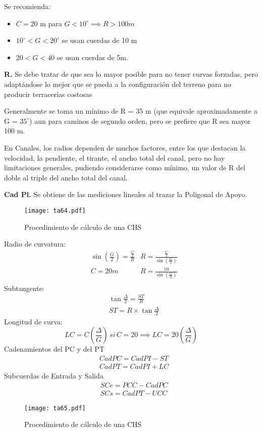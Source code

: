 Se recomienda:
\begin{itemize}
    \item $C=20$ m para $G < 10^{\circ} \implies R > 100 m$
    \item $10^{\circ} <G<20^{\circ}$ se usan cuerdas de 10 m
    \item $20<G<40$ se usan cuerdas de 5m.
\end{itemize}

\textbf{R.} Se debe tratar de que sea lo mayor posible para no tener curvas forzadas, pero adaptándose lo mejor que se pueda a la configuración del terreno para no producir terracerías costosas

Generalmente se toma un mínimo de R = 35 m (que equivale aproximadamente a G = $35^{\circ}$) aun para caminos de segundo orden, pero se prefiere que R sea mayor 100 m.

En Canales, los radios dependen de muchos factores, entre los que destacan la velocidad, la pendiente, el tirante, el ancho total del canal, pero no hay limitaciones generales, pudiendo considerarse como mínimo, un valor de R del doble al triple del ancho total del canal.

\textbf{Cad Pl.} Se obtiene de las mediciones lineales al trazar la Poligonal de Apoyo.

\begin{figure}[h!]
\centering
  \texttt{[image: ta64.pdf]}
  \caption{Procedimiento de cálculo de una CHS}
  \label{ta64}
\end{figure}
Radio de curvatura:
\begin{align}
    &\sin{\left(\frac{G}{2}\right)}=\frac{\frac{C}{2}}{R}& R = \frac{\frac{C}{2}}{\sin{\left(\frac{G}{2}\right)}}\\
    &C = 20m&R = \frac{10}{\sin{\left(\frac{G}{2}\right)}}\\
\end{align}
Subtangente:
\begin{align}
    &\tan{\frac{\Delta}{2}} = \frac{ST}{R}\\
    &ST = R \times \tan{\frac{\Delta}{2}}  
\end{align}
Longitud de curva:
\begin{equation*}
    LC = C\left(\frac{\Delta}{G}\right)\, si\, C= 20\implies LC = 20\left(\frac{\Delta}{G}\right)
\end{equation*}
Cadenamientos del PC y del PT
\begin{align}
    &CadPC = CadPI - ST\\
    &CadPT = CadPI + LC
\end{align}
Subcuerdas de Entrada y Salida
\begin{align}
    &SCe = PCC - CadPC\\
    &SCs = CadPT - UCC
\end{align}
\begin{figure}[h!]
\centering
  \texttt{[image: ta65.pdf]}
  \caption{Procedimiento de cálculo de una CHS}
  \label{ta65}
\end{figure}
